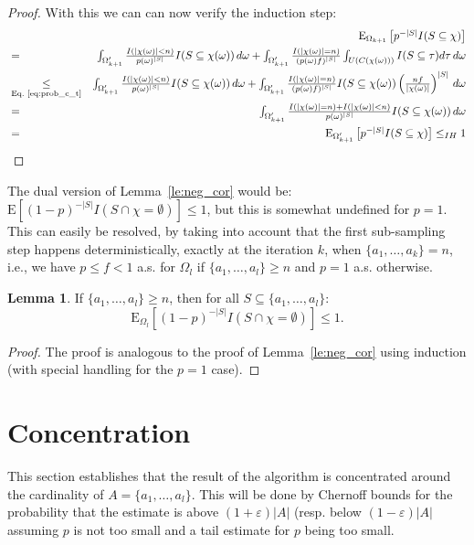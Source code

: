 \documentclass{article}
\newcommand{\expectation}{\mathrm{E}}
\newcommand{\eps}{\varepsilon}
\theoremstyle{definition}
\newtheorem{lemma}{Lemma}
\begin{document}
\begin{proof}
With this we can can now verify the induction step:
\begin{eqnarray*}
&  & \textstyle\expectation_{\Omega_{k+1}}\left[p^{-|S|} I(S \subseteq \chi)\right]  \\
& = &\textstyle \int_{\Omega'_{k+1}} \frac{I(|\chi(\omega)| < n)}{p(\omega)^{|S|}} I(S \subseteq \chi(\omega)) \, d \omega 
+ \int_{\Omega'_{k+1}} \frac{I(|\chi(\omega)| = n)}{(p(\omega)f)^{|S|}} \int_{U(C(\chi(\omega)))} I(S \subseteq \tau) d \tau \, d \omega  \\
& \underset{\textrm{Eq.~\ref{eq:prob_c_t}}}{\leq} & \textstyle \int_{\Omega'_{k+1}} \frac{I(|\chi(\omega)| < n)}{p(\omega)^{|S|}} I(S \subseteq \chi(\omega)) \, d \omega
+ \int_{\Omega'_{k+1}} \frac{I(|\chi(\omega)| = n)}{(p(\omega)f)^{|S|}} I(S \subseteq \chi(\omega)) \left(\frac{nf}{|\chi(\omega)|}\right)^{|S|} \, d \omega  \\
& = & \textstyle \int_{\Omega'_{k+1}} \frac{I(|\chi(\omega)| = n)+I(|\chi(\omega)| < n)}{p(\omega)^{|S|}} I(S \subseteq \chi(\omega)) \, d \omega \\
& = & \textstyle \expectation_{\Omega'_{k+1}}\left[p^{-|S|} I(S \subseteq \chi) \right] \leq_{IH} 1
\end{eqnarray*}

\end{proof}
The dual version of Lemma~\ref{le:neg_cor} would be: $\expectation[ (1-p)^{-|S|} I(S \cap \chi=\emptyset) ] \leq 1$, but this is somewhat undefined for $p=1$.
This can easily be resolved, by taking into account that the first sub-sampling step happens deterministically, exactly at the iteration $k$, when $\{a_1,\ldots,a_k\} = n$,
i.e., we have $p \leq f < 1$ a.s. for $\Omega_l$ if $\{a_1,\ldots,a_l\} \geq n$ and $p=1$ a.s. otherwise.

\begin{lemma}
\label{le:neg_cor_2}
If $\{a_1,\ldots,a_l\} \geq n$, then for all $S \subseteq \{a_1,\ldots,a_l\}$:
\[
\expectation_{\Omega_l} \left[ (1-p)^{-|S|} I(S \cap \chi=\emptyset) \right] \leq 1 \textrm{.}
\]
\end{lemma}
\begin{proof}
The proof is analogous to the proof of Lemma~\ref{le:neg_cor} using induction (with special handling for the $p=1$ case).
\end{proof}
  
\section{Concentration}
This section establishes that the result of the algorithm is concentrated around the cardinality of $A = \{ a_1, \ldots, a_l \}$. This will be done by Chernoff bounds for the probability that the estimate is above $(1+\eps)|A|$ (resp. below $(1-\eps)|A|$ assuming $p$ is not too small and a tail estimate for $p$ being too small.
\end{document}
